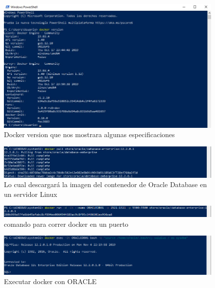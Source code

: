 \documentclass[preprint,12pt]{elsarticle}
\begin{document}
\begin{figure}[H]
	\begin{center}
		\includegraphics[width=12cm]{./IMAGENES/foto5} 
		\caption{Docker version que nos mostrara algunas especificaciones}
	\end{center}
\end{figure}


\begin{figure}[H]
	\begin{center}
		\includegraphics[width=12cm]{./IMAGENES/imagen2} 
		\caption{Lo cual descargará la imagen del contenedor de Oracle Database en un servidor Linux}
	\end{center}
\end{figure}

\begin{figure}[H]
	\begin{center}
		\includegraphics[width=12cm]{./IMAGENES/IMAGEN3} 
		\caption{comando para correr docker en un puerto}
	\end{center}
\end{figure}
\begin{figure}[H]
	\begin{center}
		\includegraphics[width=12cm]{./IMAGENES/IMAGEN5} 
		\caption{Executar docker con ORACLE}
	\end{center}
\end{figure}
\end{document}
